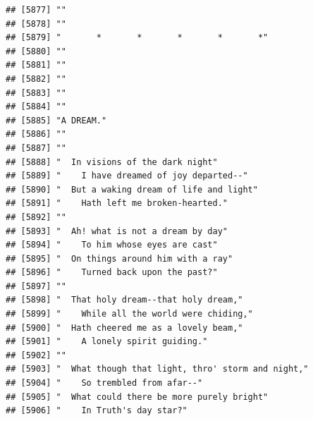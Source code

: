 \documentclass{article}\usepackage[]{graphicx}\usepackage[]{color}
\makeatletter
\newenvironment{kframe}{%
 \def\at@end@of@kframe{}%
 \ifinner\ifhmode%
  \def\at@end@of@kframe{\end{minipage}}%
  \begin{minipage}{\columnwidth}%
 \fi\fi%
 \def\FrameCommand##1{\hskip\@totalleftmargin \hskip-\fboxsep
 \colorbox{shadecolor}{##1}\hskip-\fboxsep
     \hskip-\linewidth \hskip-\@totalleftmargin \hskip\columnwidth}%
 \MakeFramed {\advance\hsize-\width
   \@totalleftmargin\z@ \linewidth\hsize
   \@setminipage}}%
 {\par\unskip\endMakeFramed%
 \at@end@of@kframe}
\newenvironment{knitrout}{}{} %
\makeatother
\begin{document}
\begin{knitrout}
\begin{kframe}
\begin{verbatim}
## [5877] ""                                                                            
## [5878] ""                                                                            
## [5879] "       *       *       *       *       *"                                    
## [5880] ""                                                                            
## [5881] ""                                                                            
## [5882] ""                                                                            
## [5883] ""                                                                            
## [5884] ""                                                                            
## [5885] "A DREAM."                                                                    
## [5886] ""                                                                            
## [5887] ""                                                                            
## [5888] "  In visions of the dark night"                                              
## [5889] "    I have dreamed of joy departed--"                                        
## [5890] "  But a waking dream of life and light"                                      
## [5891] "    Hath left me broken-hearted."                                            
## [5892] ""                                                                            
## [5893] "  Ah! what is not a dream by day"                                            
## [5894] "    To him whose eyes are cast"                                              
## [5895] "  On things around him with a ray"                                           
## [5896] "    Turned back upon the past?"                                              
## [5897] ""                                                                            
## [5898] "  That holy dream--that holy dream,"                                         
## [5899] "    While all the world were chiding,"                                       
## [5900] "  Hath cheered me as a lovely beam,"                                         
## [5901] "    A lonely spirit guiding."                                                
## [5902] ""                                                                            
## [5903] "  What though that light, thro' storm and night,"                            
## [5904] "    So trembled from afar--"                                                 
## [5905] "  What could there be more purely bright"                                    
## [5906] "    In Truth's day star?"                                                    

\end{verbatim}
\end{kframe}
\end{knitrout}
\end{document}
